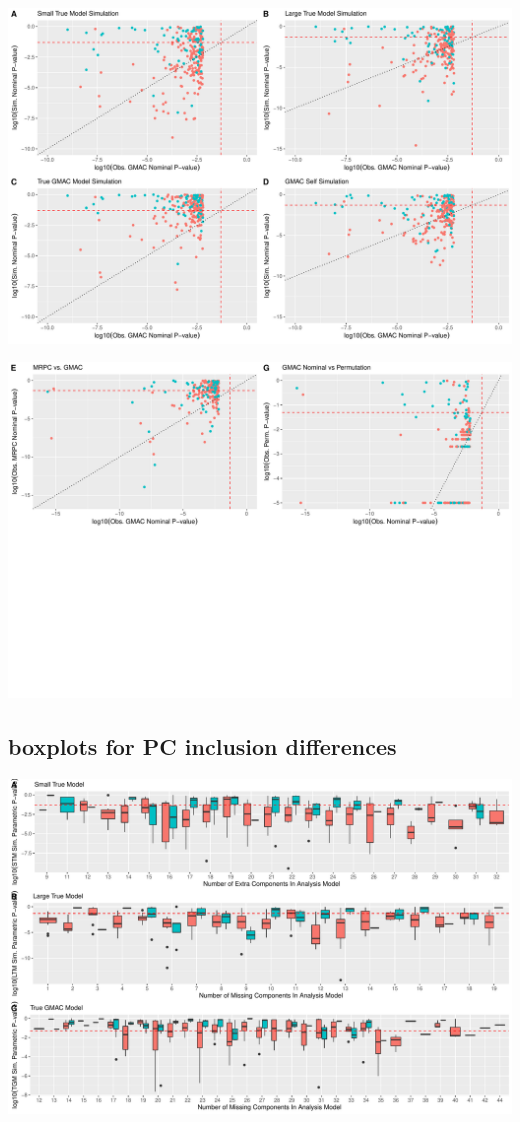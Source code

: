 \documentclass[
]{article}
\begin{document}
\includegraphics{GMACwriteup2_files/figure-latex/unnamed-chunk-5-1.pdf}

\includegraphics{GMACwriteup2_files/figure-latex/unnamed-chunk-6-1.pdf}

\hypertarget{boxplots-for-pc-inclusion-differences}{%
\subsection{boxplots for PC inclusion
differences}\label{boxplots-for-pc-inclusion-differences}}

\includegraphics{GMACwriteup2_files/figure-latex/unnamed-chunk-7-1.pdf}
\end{document}
